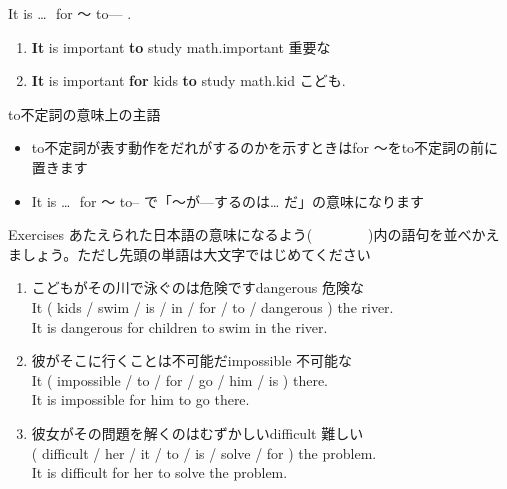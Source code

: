 \documentclass[aspectratio=169,xcolor={dvipsnames,table}]{beamer}
\begin{document}
\begin{frame}[plain]{It is \ldots\,\, for ～ to--- .}
 \large

\begin{enumerate}
 \item {\bfseries It} is important {\bfseries to} study math.\hfill{\scriptsize important  重要な}
 \item {\bfseries It} is important {\bfseries for} kids {\bfseries to} study math.\hfill{\scriptsize kid  こども}.
\end{enumerate}

\begin{block}{to不定詞の意味上の主語}\small
\begin{itemize}[square]
 \item to不定詞が表す動作をだれがするのかを示すときはfor ～をto不定詞の前に置きます
 \item It is \ldots\,\, for ～ to--\,\,で「～が---するのは\ldots\,\,だ」の意味になります
\end{itemize}
\end{block}
\mbox{}\hfill{\scriptsize {}}
\end{frame}
\begin{frame}[plain]{Exercises}
 あたえられた日本語の意味になるよう(~~~~~~~~)内の語句を並べかえましょう。ただし先頭の単語は大文字ではじめてください%
\mbox{}\hfill{\scriptsize {}}

\begin{enumerate}
 \item こどもがその川で泳ぐのは危険です\hfill{\scriptsize dangerous  危険な}\\
It ( kids / swim / is / in / for / to / dangerous ) the river.\\
It is dangerous for children to swim in the river.
 \item 彼がそこに行くことは不可能だ\hfill{\scriptsize impossible  不可能な}\\
It ( impossible / to / for / go / him / is ) there.\\
It is impossible for him to go there.
 \item 彼女がその問題を解くのはむずかしい\hfill{\scriptsize difficult  難しい}\\
( difficult / her / it / to / is / solve / for ) the problem.\\
It is difficult for her to solve the problem.

\end{enumerate}
\end{frame}
\end{document}
